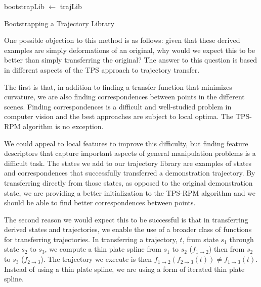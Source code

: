\begin{algorithm}

 bootstrapLib $\leftarrow$ trajLib\;
 \caption{Bootstrapping a Trajectory Library}
 \label{alg:bootstrap}
\end{algorithm}

One possible objection to this method is as follows: given that these derived examples are simply deformations of an original, why would we expect this to be better than simply transferring the original? The answer to this question is based in different aspects of the TPS approach to trajectory transfer.

The first is that, in addition to finding a transfer function that minimizes curvature, we are also finding correspondences between points in the different scenes. Finding correspondences is a difficult and well-studied problem in computer vision and the best approaches are subject to local optima. The TPS-RPM algorithm is no exception. 

We could appeal to local features to improve this difficulty, but finding feature descriptors that capture important aspects of general manipulation problems is a difficult task. The states we add to our trajectory library are examples of states and correspondences that successfully transferred a demonstration trajectory. By transferring directly from those states, as opposed to the original demonstration state, we are providing a better 
initialization to the TPS-RPM algorithm and we should be able to find better correspondences between points.

The second reason we would expect this to be successful is that in transferring derived states and trajectories, we enable the use of a broader class of functions for transferring trajectories. In transferring a trajectory, $t$, from state $s_1$ through state $s_2$ to $s_3$, we compute a thin plate spline from $s_1$ to $s_2$ 
($f_{1\rightarrow 2}$) then from $s_2$ to $s_3$ ($f_{2\rightarrow 3}$). The trajectory we execute is then $f_{1\rightarrow 2}(f_{2\rightarrow 3}(t)) \ne f_{1\rightarrow 3}(t)$. 
Instead of using a thin plate spline, we are using a form of iterated thin plate spline.

